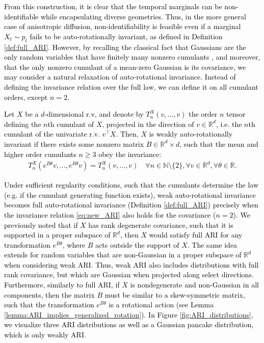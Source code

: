 \documentclass[twoside,11pt]{article}
\newcommand{\N}{\mathbb{N}}
\newcommand{\R} {\mathbb R}
\newcommand{\rv}[1]{\textcolor{black}{#1}}
\begin{document}
\rv{From this construction, it is clear that the temporal marginals can be non-identifiable while encapsulating diverse geometries. Thus, in the more general case of anisotropic diffusion, non-identifiability is feasible even if a marginal $X_t \sim p_t$ fails to be auto-rotationally invariant, as defined in Definition \ref{def:full_ARI}. However, by recalling the classical fact that Gaussians are the only random variables that have finitely many nonzero cumulants \citep{marcinkiewicz1939propriete}, and moreover, that the only nonzero cumulant of a mean-zero Gaussian is its covariance, we may consider a natural relaxation of auto-rotational invariance. Instead of defining the invariance relation over the full law, we can define it on all cumulant orders, except $n=2$.}


\rv{\begin{definition}
\label{def:weak_ari}
Let $X$ be a $d$-dimensional r.v, and denote by $T_n^X(v, \ldots, v)$ the order $n$ tensor defining the $n$th cumulant of $X$, projected in the direction of $v \in \R^d$, i.e. the $n$th cumulant of the univariate r.v. $v^\top X$. Then, $X$ is weakly auto-rotationally invariant if there exists some nonzero matrix $B \in \R^d \times d$, such that the mean and higher order cumulants $n \ge 3$ obey the invariance:
\begin{align}
    T_n^X(e^{B\theta}v, \ldots,e^{B\theta}v) = T_n^X(v, \ldots, v) \quad \forall n \in \N \setminus \{2\}, \forall  v \in \R^d, \forall \theta \in \R.
    \label{eq:new_ARI}
\end{align}
\end{definition}}

\rv{Under sufficient regularity conditions, such that the cumulants determine the law (e.g. if the cumulant generating function exists), weak auto-rotational invariance becomes full auto-rotational invariance (Definition \ref{def:full_ARI}) precisely when the invariance relation \eqref{eq:new_ARI} also holds for the covariance ($n=2$). We previously noted that if $X$ has rank degenerate covariance, such that it is supported in a proper subspace of $\R^d$, then $X$ would satisfy full ARI for any transformation $e^{B\theta}$, where $B$ acts outside the support of $X$. The same idea extends for random variables that are non-Gaussian in a proper subspace of $\R^d$ when considering weak ARI. Thus, weak ARI also includes distributions with full rank covariance, but which are Gaussian when projected along select directions. Furthermore, similarly to full ARI, if $X$ is nondegenerate and non-Gaussian in all components, then the matrix $B$ must be similar to a skew-symmetric matrix, such that the transformation $e^{B\theta}$ is a rotational action (see Lemma \ref{lemma:ARI_implies_generalized_rotation}). In Figure \ref{fig:ARI_distributions}, we visualize three ARI distributions as well as a Gaussian pancake distribution, which is only weakly ARI.}
\end{document}
